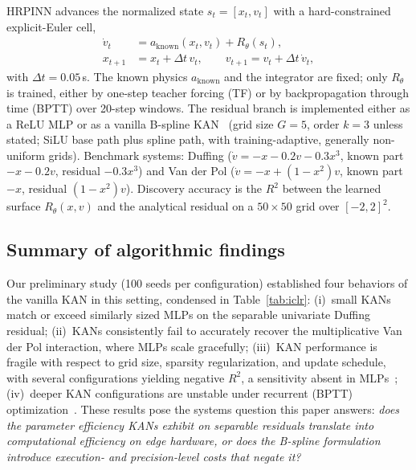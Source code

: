 \documentclass[conference]{IEEEtran}
\newcommand{\Rsq}{R^2}
\begin{document}
HRPINN advances the normalized state $s_t=[x_t,v_t]$ with a hard-constrained
explicit-Euler cell,
\begin{equation}
\label{eq:cell}
\begin{aligned}
\dot v_t &= a_{\mathrm{known}}(x_t,v_t) + R_\theta(s_t),\\
x_{t+1} &= x_t + \Delta t\, v_t,\qquad
v_{t+1} = v_t + \Delta t\, \dot v_t,
\end{aligned}
\end{equation}
with $\Delta t=0.05$\,s. The known physics $a_{\mathrm{known}}$ and the
integrator are fixed; only $R_\theta$ is trained, either by one-step teacher
forcing (TF) or by backpropagation through time (BPTT) over 20-step windows.
The residual branch is implemented either as a ReLU MLP or as a vanilla
B-spline KAN~\cite{liu2024kan} (grid size $G{=}5$, order $k{=}3$ unless
stated; SiLU base path plus spline path, with training-adaptive, generally
non-uniform grids). Benchmark systems: Duffing
($\dot v = -x -0.2v -0.3x^3$, known part $-x-0.2v$, residual $-0.3x^3$) and
Van der Pol ($\dot v = -x + (1-x^2)v$, known part $-x$, residual $(1-x^2)v$).
Discovery accuracy is the $\Rsq$ between the learned surface
$R_\theta(x,v)$ and the analytical residual on a $50\times50$ grid over
$[-2,2]^2$.

\subsection{Summary of algorithmic findings}
\label{sec:algofindings}

Our preliminary study (100 seeds per configuration) established four
behaviors of the vanilla KAN in this setting, condensed in
Table~\ref{tab:iclr}:
(i)~small KANs match or exceed similarly sized MLPs on the separable
univariate Duffing residual;
(ii)~KANs consistently fail to accurately recover the multiplicative Van der
Pol interaction, where MLPs scale gracefully;
(iii)~KAN performance is fragile with respect to grid size, sparsity
regularization, and update schedule, with several configurations yielding
negative $\Rsq$, a sensitivity absent in MLPs~\cite{noorizadegan2025practitioner};
(iv)~deeper KAN configurations are unstable under recurrent (BPTT)
optimization~\cite{sohail2024training}.
These results pose the systems question this paper answers: \emph{does the
parameter efficiency KANs exhibit on separable residuals translate into
computational efficiency on edge hardware, or does the B-spline formulation
introduce execution- and precision-level costs that negate it?}
\end{document}
